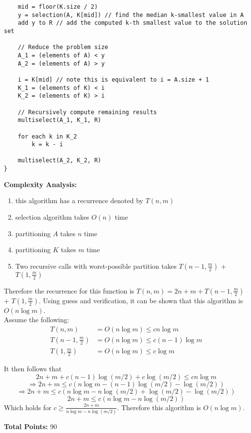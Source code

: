 \documentclass[11pt]{article}
\begin{document}
\begin{enumerate}
\begin{enumerate}
\begin{verbatim}
    mid = floor(K.size / 2)
    y = selection(A, K[mid]) // find the median k-smallest value in A
    add y to R // add the computed k-th smallest value to the solution set

    // Reduce the problem size
    A_1 = (elements of A) < y
    A_2 = (elements of A) > y

    i = K[mid] // note this is equivalent to i = A.size + 1
    K_1 = (elements of K) < i
    K_2 = (elements of K) > i

    // Recursively compute remaining results
    multiselect(A_1, K_1, R)
    
    for each k in K_2
        k = k - i
        
    multiselect(A_2, K_2, R)
}
\end{verbatim}

\textbf{Complexity Analysis:} 
\begin{enumerate}
\item this algorithm has a recurrence denoted by $T(n,m)$
\item selection algorithm takes $O(n)$ time
\item partitioning $A$ takes $n$ time
\item partitioning $K$ takes $m$ time
\item Two recursive calls with worst-possible partition takes $T\left(n-1,\frac{m}{2}\right)$ + $T\left(1,\frac{m}{2}\right)$
\end{enumerate}
Therefore the recurrence for this function is 
$T(n,m) = 2n + m + T\left(n-1,\frac{m}{2}\right)$ + $T\left(1,\frac{m}{2}\right)$.
Using guess and verification, it can be shown that this algorithm is $O(n\log m)$.\\
Assume the following:
\begin{align*}
T(n,m)                        &= O(n\log m) \leq cn\log m\\
T\left(n-1,\frac{m}{2}\right) &= O(n\log m) \leq c(n-1)\log m\\
T\left(1,\frac{m}{2}\right)   &= O(n\log m) \leq c\log m
\end{align*}

It then follows that
\[2n + m + c(n-1)\log (m/2) + c\log(m/2) \leq cn\log m\]
\[\Rightarrow 2n + m \leq c(n\log m - (n - 1)\log (m/2) - \log (m/2))\]
\[\Rightarrow 2n + m \leq c(n\log m - n\log (m/2) + \log (m/2) - \log (m/2))\]
\[2n + m \leq c(n \log m - n \log (m/2))\]
Which holds for $c \geq \frac{2n + m}{n \log m - n \log (m/2)}$. Therefore this algorithm is $O(n\log m)$.

\end{enumerate}

\end{enumerate}

{\bf Total Points:} 90
\end{document}
